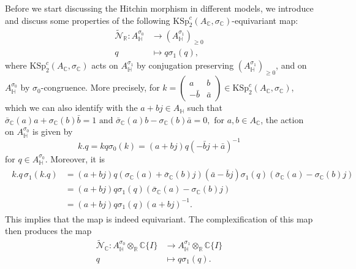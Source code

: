 \documentclass[oneside,11pt]{amsart}
\theoremstyle{definition}
\theoremstyle{remark}
\numberwithin{thm}{section}
\numberwithin{equation}{section}
\begin{document}
Before we start discussing the Hitchin morphism in different models, we introduce and discuss some properties of the following $\mathrm{KSp}^c_2(A_\mathbb C,\sigma_{\mathbb{C}})$-equivariant map:
\begin{align*}
\tilde{\mathcal{N}}_\mathbb R\colon A_{\mathbb{H}}^{\sigma_0} & \to (A_{\mathbb{H}}^{\sigma_1})_{\geq 0}\\
q & \mapsto q\sigma_1(q),
\end{align*}
where $\mathrm{KSp}^c_2(A_\mathbb C,\sigma_{\mathbb{C}})$  acts on $A^{\sigma_1}_\mathbb H$ by conjugation preserving $(A_{\mathbb{H}}^{\sigma_1})_{\geq 0}$, and on $A^{\sigma_0}_\mathbb H$ by $\sigma_0$-congruence. More precisely, for $k=\begin{pmatrix}
a & b\\
-\bar{b} & \bar{a}
\end{pmatrix}\in \mathrm{KSp}^c_2(A_\mathbb C,\sigma_{\mathbb{C}})$, which we can also identify with the $a+bj\in A_\mathbb H$ such that  $\bar{\sigma}_{\mathbb{C}}(a)a+\sigma_{\mathbb{C}}(b)\bar{b}=1 \text{ and } \bar{\sigma}_{\mathbb{C}}(a)b-\sigma_{\mathbb{C}}(b)\bar{a}=0, \text{ for } a,b\in A_{\mathbb{C}}$, the action on $A_{\mathbb{H}}^{\sigma_0}$ is given by 
\begin{equation}\label{eq:action_on_A^sigma0}
    k.q = kq\sigma_0(k)=(a+bj)q(-\bar{b}j+\bar{a})^{-1}
\end{equation}
for $q\in A_{\mathbb{H}}^{\sigma_0}$. 
Moreover, it is 
\begin{align}\label{eq:invariance}
\begin{aligned}
 k.q\,\sigma_1(k.q) & = (a+bj)q\left( \sigma_{\mathbb{C}}(a)+\bar{\sigma}_{\mathbb{C}}(b)j\right)(\bar{a} - \bar{b}j) \sigma_1(q) \left( \bar{\sigma}_{\mathbb{C}}(a)-\sigma_{\mathbb{C}}(b)j\right)\\
 & = (a+bj)q\sigma_1(q) \left( \bar{\sigma}_{\mathbb{C}}(a)-\sigma_{\mathbb{C}}(b)j\right)\\
 & =(a+bj)q\sigma_1(q) (a+bj)^{-1}.
 \end{aligned}
\end{align}
This implies that the map is indeed equivariant. 
The complexification of this map then produces the map 
\begin{align*}
\tilde{\mathcal{N}}_\mathbb C\colon A_{\mathbb{H}}^{\sigma_0} \otimes_{\mathbb{R}} \mathbb{C}\{I\}& \to A_{\mathbb{H}}^{\sigma_1} \otimes_{\mathbb{R}} \mathbb{C}\{I\}\\
q & \mapsto q\sigma_1(q).
\end{align*}
\end{document}
